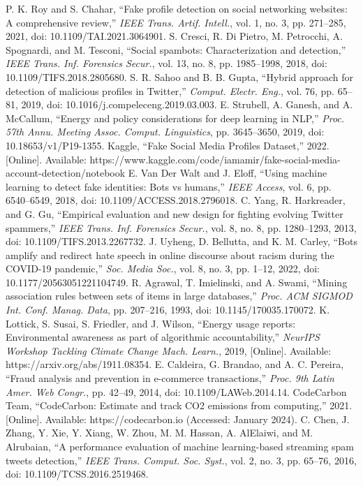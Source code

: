 \documentclass[conference]{IEEEtran}
\begin{document}
\begin{thebibliography}{00}
 P. K. Roy and S. Chahar, ``Fake profile detection on social networking websites: A comprehensive review,'' \textit{IEEE Trans. Artif. Intell.}, vol. 1, no. 3, pp. 271--285, 2021, doi: 10.1109/TAI.2021.3064901.
 S. Cresci, R. Di Pietro, M. Petrocchi, A. Spognardi, and M. Tesconi, ``Social spambots: Characterization and detection,'' \textit{IEEE Trans. Inf. Forensics Secur.}, vol. 13, no. 8, pp. 1985--1998, 2018, doi: 10.1109/TIFS.2018.2805680.
 S. R. Sahoo and B. B. Gupta, ``Hybrid approach for detection of malicious profiles in Twitter,'' \textit{Comput. Electr. Eng.}, vol. 76, pp. 65--81, 2019, doi: 10.1016/j.compeleceng.2019.03.003.
 E. Strubell, A. Ganesh, and A. McCallum, ``Energy and policy considerations for deep learning in NLP,'' \textit{Proc. 57th Annu. Meeting Assoc. Comput. Linguistics}, pp. 3645--3650, 2019, doi: 10.18653/v1/P19-1355.
 Kaggle, ``Fake Social Media Profiles Dataset,'' 2022. [Online]. Available: https://www.kaggle.com/code/iamamir/fake-social-media-account-detection/notebook
 E. Van Der Walt and J. Eloff, ``Using machine learning to detect fake identities: Bots vs humans,'' \textit{IEEE Access}, vol. 6, pp. 6540--6549, 2018, doi: 10.1109/ACCESS.2018.2796018.
 C. Yang, R. Harkreader, and G. Gu, ``Empirical evaluation and new design for fighting evolving Twitter spammers,'' \textit{IEEE Trans. Inf. Forensics Secur.}, vol. 8, no. 8, pp. 1280--1293, 2013, doi: 10.1109/TIFS.2013.2267732.
 J. Uyheng, D. Bellutta, and K. M. Carley, ``Bots amplify and redirect hate speech in online discourse about racism during the COVID-19 pandemic,'' \textit{Soc. Media Soc.}, vol. 8, no. 3, pp. 1--12, 2022, doi: 10.1177/20563051221104749.
 R. Agrawal, T. Imielinski, and A. Swami, ``Mining association rules between sets of items in large databases,'' \textit{Proc. ACM SIGMOD Int. Conf. Manag. Data}, pp. 207--216, 1993, doi: 10.1145/170035.170072.
 K. Lottick, S. Susai, S. Friedler, and J. Wilson, ``Energy usage reports: Environmental awareness as part of algorithmic accountability,'' \textit{NeurIPS Workshop Tackling Climate Change Mach. Learn.}, 2019, [Online]. Available: https://arxiv.org/abs/1911.08354.
 E. Caldeira, G. Brandao, and A. C. Pereira, ``Fraud analysis and prevention in e-commerce transactions,'' \textit{Proc. 9th Latin Amer. Web Congr.}, pp. 42--49, 2014, doi: 10.1109/LAWeb.2014.14.
 CodeCarbon Team, ``CodeCarbon: Estimate and track CO2 emissions from computing,'' 2021. [Online]. Available: https://codecarbon.io (Accessed: January 2024).
 C. Chen, J. Zhang, Y. Xie, Y. Xiang, W. Zhou, M. M. Hassan, A. AlElaiwi, and M. Alrubaian, ``A performance evaluation of machine learning-based streaming spam tweets detection,'' \textit{IEEE Trans. Comput. Soc. Syst.}, vol. 2, no. 3, pp. 65--76, 2016, doi: 10.1109/TCSS.2016.2519468.
\end{thebibliography}
\end{document}

